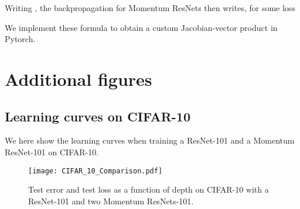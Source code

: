 \documentclass{article}
\begin{document}
Writing , the backpropagation for Momentum ResNets then writes, for some loss  


We implement these formula to obtain a custom Jacobian-vector product in Pytorch.

\section{Additional figures}\label{app:figures}

\subsection{Learning curves on CIFAR-10}

We here show the learning curves when training a ResNet-101 and a Momentum ResNet-101 on CIFAR-10.

\begin{figure}[H]
\vskip 0.2in
\begin{center}
\centerline{\texttt{[image: CIFAR\_10\_Comparison.pdf]}}
\caption{Test error and test loss as a function of depth on CIFAR-10 with a ResNet-101 and two Momentum ResNets-101.}
\end{center}
\vskip -0.2in
\end{figure}
\end{document}
